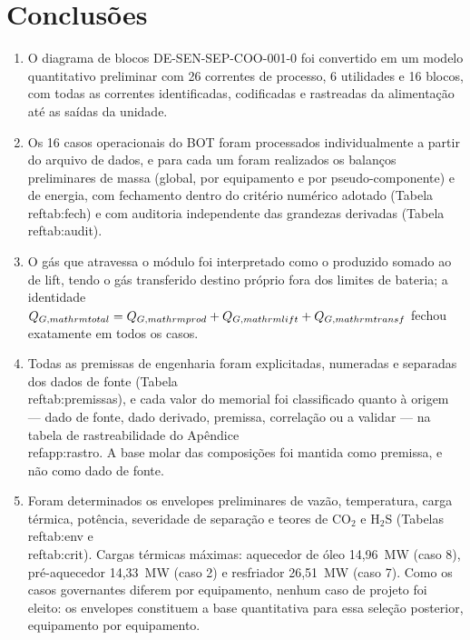 \documentclass[11pt,a4paper]{article}
\numberwithin{equation}{section}
\numberwithin{table}{section}
\numberwithin{figure}{section}
\begin{document}
\section{Conclusões}
\begin{enumerate}
\item O diagrama de blocos DE-SEN-SEP-COO-001-0 foi convertido em um modelo quantitativo preliminar com 26 correntes de processo, 6 utilidades e 16 blocos, com todas as correntes identificadas, codificadas e rastreadas da alimentação até as saídas da unidade.
\item Os 16 casos operacionais do BOT foram processados individualmente a partir do arquivo de dados, e para cada um foram realizados os balanços preliminares de massa (global, por equipamento e por pseudo-componente) e de energia, com fechamento dentro do critério numérico adotado (Tabela~\\ref{tab:fech}) e com auditoria independente das grandezas derivadas (Tabela~\\ref{tab:audit}).
\item O gás que atravessa o módulo foi interpretado como o produzido somado ao de lift, tendo o gás transferido destino próprio fora dos limites de bateria; a identidade $Q_{G,\\mathrm{total}}=Q_{G,\\mathrm{prod}}+Q_{G,\\mathrm{lift}}+Q_{G,\\mathrm{transf}}$ fechou exatamente em todos os casos.
\item Todas as premissas de engenharia foram explicitadas, numeradas e separadas dos dados de fonte (Tabela~\\ref{tab:premissas}), e cada valor do memorial foi classificado quanto à origem --- dado de fonte, dado derivado, premissa, correlação ou a validar --- na tabela de rastreabilidade do Apêndice~\\ref{app:rastro}. A base molar das composições foi mantida como premissa, e não como dado de fonte.
\item Foram determinados os envelopes preliminares de vazão, temperatura, carga térmica, potência, severidade de separação e teores de CO$_2$ e H$_2$S (Tabelas~\\ref{tab:env} e~\\ref{tab:crit}). Cargas térmicas máximas: aquecedor de óleo 14,96~MW (caso 8), pré-aquecedor 14,33~MW (caso 2) e resfriador 26,51~MW (caso 7). Como os casos governantes diferem por equipamento, nenhum caso de projeto foi eleito: os envelopes constituem a base quantitativa para essa seleção posterior, equipamento por equipamento.

\end{enumerate}
\end{document}
